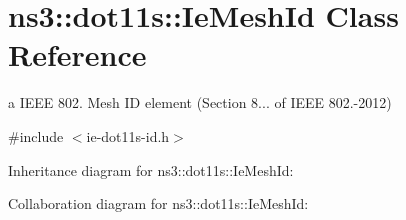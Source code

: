 \hypertarget{classns3_1_1dot11s_1_1IeMeshId}{}\section{ns3\+:\+:dot11s\+:\+:Ie\+Mesh\+Id Class Reference}
\label{classns3_1_1dot11s_1_1IeMeshId}


a I\+E\+EE 802. Mesh ID element (Section 8... of I\+E\+EE 802.-\/2012)  




{\ttfamily \#include $<$ie-\/dot11s-\/id.\+h$>$}



Inheritance diagram for ns3\+:\+:dot11s\+:\+:Ie\+Mesh\+Id\+:


Collaboration diagram for ns3\+:\+:dot11s\+:\+:Ie\+Mesh\+Id\+:
